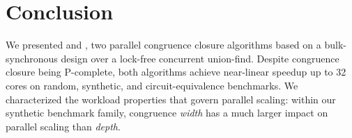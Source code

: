 \section{Conclusion}
\label{sec:conclusion}

We presented \parentalgo and \filteralgo, two parallel congruence closure
algorithms based on a bulk-synchronous design over a lock-free concurrent
union-find. Despite congruence closure being P-complete, both
algorithms achieve near-linear speedup up to 32 cores on random, synthetic,
and circuit-equivalence benchmarks. We characterized the workload properties
that govern parallel scaling: within our synthetic benchmark family, congruence 
\emph{width} has a much larger impact on parallel scaling than \emph{depth}.
